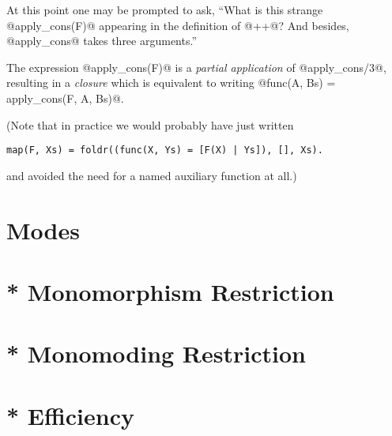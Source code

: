 At this point one may be prompted to ask, ``What is this strange
@apply_cons(F)@ appearing in the definition of @++@?  And besides,
@apply_cons@ takes three arguments.''

The expression @apply_cons(F)@ is a \emph{partial application} of
@apply_cons/3@, resulting in a \emph{closure} which is equivalent to
writing @func(A, Bs) = apply_cons(F, A, Bs)@.


(Note that in practice we would probably have just written
\begin{verbatim}
map(F, Xs) = foldr((func(X, Ys) = [F(X) | Ys]), [], Xs).
\end{verbatim}
and avoided the need for a named auxiliary function at all.)





\section{Modes}
\section{* Monomorphism Restriction}
\section{* Monomoding Restriction}
\section{* Efficiency}



